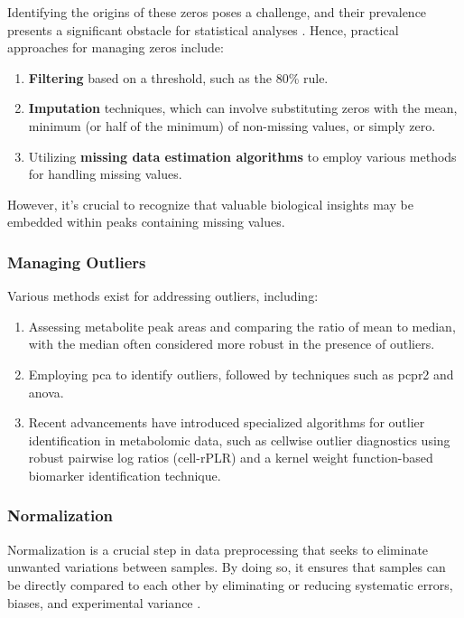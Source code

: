 \documentclass[ENG, BIB]{TFUOC}%
\begin{document}
Identifying the origins of these zeros poses a challenge, and their prevalence presents a significant obstacle for statistical analyses \cite{sunPretreatingNormalizingMetabolomics2024,martin-fernandezDealingZeros2011}. Hence, practical approaches for managing zeros include:
\begin{enumerate}
    \item \textbf{Filtering} based on a threshold, such as the 80\% rule.
    \item \textbf{Imputation} techniques, which can involve substituting zeros with the mean, minimum (or half of the minimum) of non-missing values, or simply zero.
    \item Utilizing \textbf{missing data estimation algorithms} to employ various methods for handling missing values.
\end{enumerate}

However, it's crucial to recognize that valuable biological insights may be embedded within peaks containing missing values.

\subsubsection{Managing Outliers}
Various methods exist for addressing outliers, including:

\begin{enumerate}
    \item Assessing metabolite peak areas and comparing the ratio of mean to median, with the median often considered more robust in the presence of outliers. 
    \item Employing \acrfull{pca} to identify outliers, followed by techniques such as \acrfull{pcpr2} and \acrfull{anova}.
    \item Recent advancements have introduced specialized algorithms for outlier identification in metabolomic data, such as cellwise outlier diagnostics using robust pairwise log ratios (cell-rPLR) and a kernel weight function-based biomarker identification technique.
\end{enumerate}


\subsubsection{Normalization}
Normalization is a crucial step in data preprocessing that seeks to eliminate unwanted variations between samples. By doing so, it ensures that samples can be directly compared to each other by eliminating or reducing systematic errors, biases, and experimental variance \cite{zachariasStatisticalAnalysisNMR2018}. 
\end{document}

